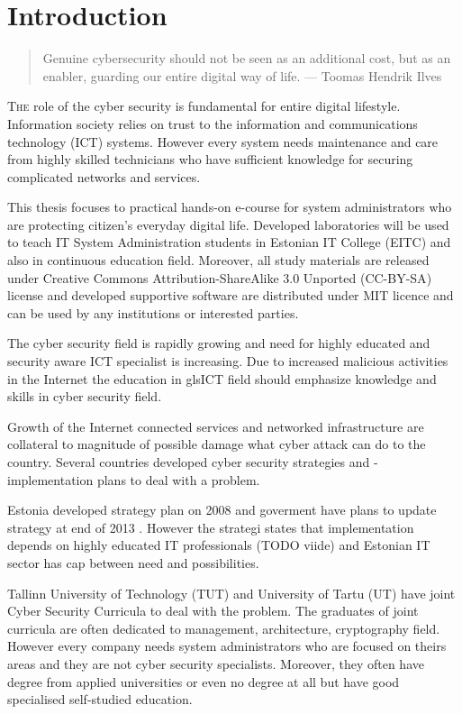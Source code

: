 \chapter{Introduction}
\label{Introduction}

 
\begin{quote}
Genuine cybersecurity should not be seen as an additional cost, but as an enabler, guarding our entire digital way of life. --- Toomas Hendrik Ilves
\end{quote}

\lettrine[lraise=0.1, nindent=0em, slope=-.5em]{\color{Violet}T}{he} role of the cyber security is fundamental for entire digital lifestyle. Information society relies on trust to the information and communications technology (\gls{ICT}) systems. However every system needs maintenance and care from highly skilled technicians who have sufficient knowledge for securing complicated networks and services. 

This thesis focuses to practical hands-on e-course for system administrators who are protecting citizen’s everyday digital life. Developed laboratories will be used to teach IT System Administration students in Estonian IT College (\gls{EITC}) and also in continuous education field. Moreover, all study materials are released under Creative Commons Attribution-ShareAlike 3.0 Unported  (\gls{CC-BY-SA}) license and developed supportive software are distributed under \gls{MIT} licence and can be used by any institutions or interested parties.

The cyber security field is rapidly growing and need for highly educated and security aware \gls{ICT} specialist is increasing. Due to increased malicious activities in the Internet the education in gls{ICT} field should emphasize knowledge and skills in cyber security field.

Growth of the Internet connected services and networked infrastructure are collateral to magnitude of possible damage what cyber attack can do to the country. Several countries developed cyber security strategies and -implementation plans to deal with a problem.

Estonia developed strategy plan on 2008 \citep{Strategy2008} and goverment have plans to update strategy at end of 2013 \citep{StrategyProposal2013}. However the strategi states that implementation depends on highly educated IT professionals {\color{red}(TODO viide)} and Estonian IT sector has cap between need and possibilities.

Tallinn University of Technology (\gls{TUT}) and University of Tartu (\gls{UT}) have joint Cyber Security Curricula to deal with the problem. The graduates of joint curricula are often dedicated to management, architecture, cryptography field. However every company needs system administrators who are focused on theirs areas and they are not cyber security specialists. Moreover, they often have degree from applied universities or even no degree at all but have good specialised self-studied education.


